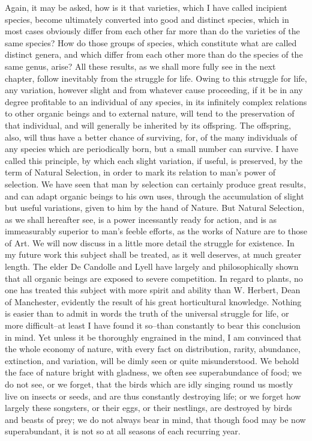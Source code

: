 Again, it may be asked, how is it that varieties, which I have called incipient species, become ultimately converted into good and distinct species, which in most cases obviously differ from each other far more than do the varieties of the same species? How do those groups of species, which constitute what are called distinct genera, and which differ from each other more than do the species of the same genus, arise? All these results, as we shall more fully see in the next chapter, follow inevitably from the struggle for life. Owing to this struggle for life, any variation, however slight and from whatever cause proceeding, if it be in any degree profitable to an individual of any species, in its infinitely complex relations to other organic beings and to external nature, will tend to the preservation of that individual, and will generally be inherited by its offspring. The offspring, also, will thus have a better chance of surviving, for, of the many individuals of any species which are periodically born, but a small number can survive. I have called this principle, by which each slight variation, if useful, is preserved, by the term of Natural Selection, in order to mark its relation to man's power of selection. We have seen that man by selection can certainly produce great results, and can adapt organic beings to his own uses, through the accumulation of slight but useful variations, given to him by the hand of Nature. But Natural Selection, as we shall hereafter see, is a power incessantly ready for action, and is as immeasurably superior to man's feeble efforts, as the works of Nature are to those of Art.
We will now discuss in a little more detail the struggle for existence. In my future work this subject shall be treated, as it well deserves, at much greater length. The elder De Candolle and Lyell have largely and philosophically shown that all organic beings are exposed to severe competition. In regard to plants, no one has treated this subject with more spirit and ability than W. Herbert, Dean of Manchester, evidently the result of his great horticultural knowledge. Nothing is easier than to admit in words the truth of the universal struggle for life, or more difficult--at least I have found it so--than constantly to bear this conclusion in mind. Yet unless it be thoroughly engrained in the mind, I am convinced that the whole economy of nature, with every fact on distribution, rarity, abundance, extinction, and variation, will be dimly seen or quite misunderstood. We behold the face of nature bright with gladness, we often see superabundance of food; we do not see, or we forget, that the birds which are idly singing round us mostly live on insects or seeds, and are thus constantly destroying life; or we forget how largely these songsters, or their eggs, or their nestlings, are destroyed by birds and beasts of prey; we do not always bear in mind, that though food may be now superabundant, it is not so at all seasons of each recurring year.
